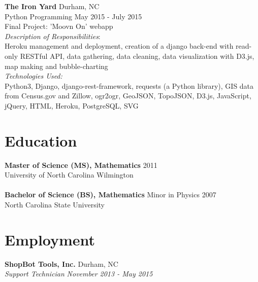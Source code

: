\documentclass[10pt]{article}
\begin{document}
{\bf The Iron Yard} \hfill Durham, NC\\
Python Programming \hfill {May 2015 - July 2015}
\vspace{5pt}\\
Final Project: 'Moovn On' webapp\\
{\it Description of Responsibilities}:\\
Heroku management and deployment, creation of a django back-end with read-only RESTful API, data gathering, data cleaning, data visualization with D3.js, map making and bubble-charting\\
{\it Technologies Used:}\\
Python3, Django, django-rest-framework, requests (a Python library), GIS data from Census.gov and Zillow, ogr2ogr, GeoJSON, TopoJSON, D3.js, JavaScript, jQuery, HTML, Heroku, PostgreSQL, SVG


\section*{Education}

{\bf Master of Science (MS), Mathematics} \hfill 2011\\
University of North Carolina Wilmington\\
\\
{\bf Bachelor of Science (BS), Mathematics} Minor in Physics \hfill 2007\\
North Carolina State University


\section*{Employment}


\noindent
{\bf ShopBot Tools, Inc.} \hfill Durham, NC\\
{\it Support Technician} \hfill {\it November 2013 - May 2015}
\end{document}

